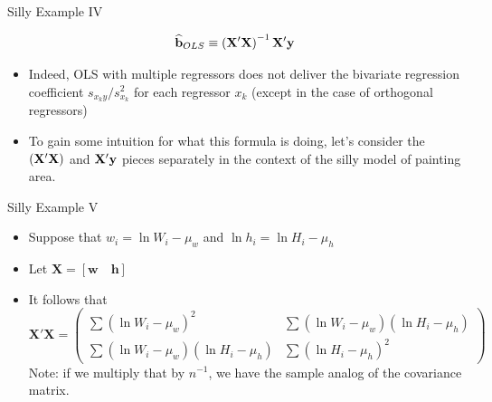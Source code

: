 \begin{frame}{Silly Example IV}

	\[
	\widehat{{\bf b}}_{OLS} \equiv  \left({\bf X}'{\bf X}\right)^{-1} {\bf X}' {\bf y} 
	\]


	\begin{itemize}
	\item Indeed, OLS with multiple regressors does not deliver 
	the bivariate regression coefficient $s_{x_{k}y}/s_{x_{k}}^{2}$ for each regressor $x_{k}$
	(except in the case of orthogonal regressors)

	\bigskip
	\item To gain some intuition for what this formula is doing, let's consider the $ \left({\bf X}'{\bf X}\right)$
	and ${\bf X}' {\bf y} $ pieces separately in the context of the silly model of painting area.


\end{itemize}
\end{frame}






\begin{frame}{Silly Example V}


	\begin{itemize}
	\item Suppose that $w_{i}=\ln W_{i}-\mu_{w}$ and $\ln h_{i}=\ln H_{i}-\mu_{h}$


	\item Let $\boldsymbol{X}=\left[\boldsymbol{w}\quad\boldsymbol{h}\right]$

	\item It follows that 
\[
\boldsymbol{X}'\boldsymbol{X}=\left(\begin{array}{cc}
\sum\left(\ln W_{i}-\mu_{w}\right)^{2} & \sum\left(\ln W_{i}-\mu_{w}\right)\left(\ln H_{i}-\mu_{h}\right)\\
\sum\left(\ln W_{i}-\mu_{w}\right)\left(\ln H_{i}-\mu_{h}\right) & \sum\left(\ln H_{i}-\mu_{h}\right)^{2}
\end{array}\right)
\]
Note: if we multiply that by $n^{-1}$, we have the sample analog of the
covariance matrix. 
	
\end{itemize}
\end{frame}

